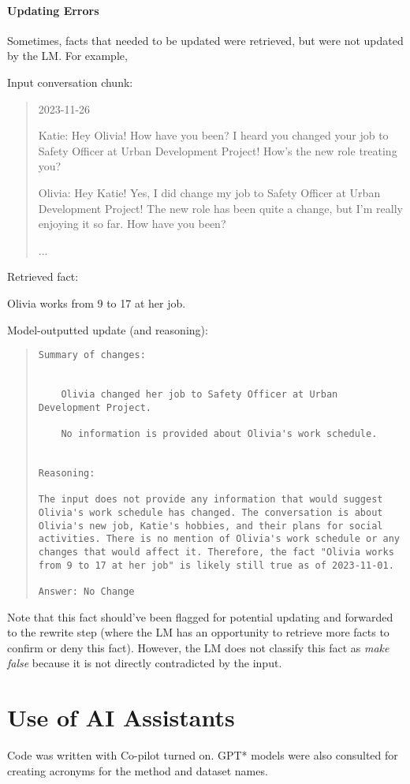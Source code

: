 \paragraph{Updating Errors}
Sometimes, facts that needed to be updated were retrieved, but were not updated by the LM. For example,

Input conversation chunk:
\begin{quote}
\it{
2023-11-26

Katie: Hey Olivia! How have you been? I heard you changed your job to Safety Officer at Urban Development Project! How's the new role treating you?

Olivia: Hey Katie! Yes, I did change my job to Safety Officer at Urban Development Project! The new role has been quite a change, but I'm really enjoying it so far. How have you been?

...
}
\end{quote}

Retrieved fact:

\begin{itemize}
\it{
\item Olivia works from 9 to 17 at her job.
}
\end{itemize}

Model-outputted update (and reasoning):
\begin{quote}
\begin{lstlisting}
Summary of changes:


    Olivia changed her job to Safety Officer at Urban Development Project.

    No information is provided about Olivia's work schedule.


Reasoning:

The input does not provide any information that would suggest Olivia's work schedule has changed. The conversation is about Olivia's new job, Katie's hobbies, and their plans for social activities. There is no mention of Olivia's work schedule or any changes that would affect it. Therefore, the fact "Olivia works from 9 to 17 at her job" is likely still true as of 2023-11-01.

Answer: No Change
\end{lstlisting}
\end{quote}

Note that this fact should've been flagged for potential updating and forwarded to the rewrite step (where the LM has an opportunity to retrieve more facts to confirm or deny this fact). 
However, the LM does not classify this fact as \textit{make false} because it is not directly contradicted by the input.



\section{Use of AI Assistants}
Code was written with Co-pilot turned on. GPT* models were also consulted for creating acronyms for the method and dataset names.